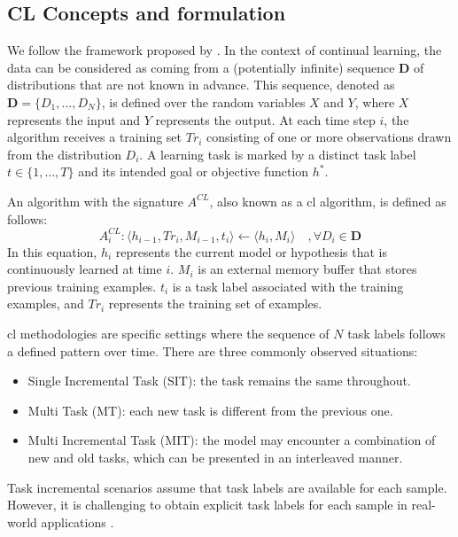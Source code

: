 \subsection{CL Concepts and formulation}
\label{subsec:cl_concepts}
We follow the framework proposed by \citep{lesort2020continual}. 
In the context of continual learning, the data can be considered as coming from a (potentially infinite) sequence $\mathbf{D}$ of distributions that are not known in advance. This sequence, denoted as $\mathbf{D} = \{ D_{1}, ..., D_{N} \}$, is defined over the random variables $X$ and $Y$, where $X$ represents the input and $Y$ represents the output. At each time step $i$, the algorithm receives a training set $Tr_{i}$ consisting of one or more observations drawn from the distribution $D_{i}$. A learning task is marked by a distinct task label $t\in \{ 1,\dots,T\}$ and its intended goal or objective function $h^{*}$.

An algorithm with the signature $A^{CL}$, also known as a \acrlong{cl} algorithm, is defined as follows: \begin{equation} \label{eq:CL_algo} A_{i}^{CL} : \langle h_{i-1}, Tr_{i}, M_{i-1}, t_{i} \rangle \leftarrow \langle h_{i}, M_{i} \rangle \quad , \forall D_{i} \in \mathbf{D} \end{equation} In this equation, $h_i$ represents the current model or hypothesis that is continuously learned at time $i$. $M_{i}$ is an external memory buffer that stores previous training examples. $t_{i}$ is a task label associated with the training examples, and $Tr_{i}$ represents the training set of examples.

\acrshort{cl} methodologies are specific settings where the sequence of $N$ task labels follows a defined pattern over time. There are three commonly observed situations: \begin{itemize} \item Single Incremental Task (SIT): the task remains the same throughout. \item Multi Task (MT): each new task is different from the previous one. \item Multi Incremental Task (MIT): the model may encounter a combination of new and old tasks, which can be presented in an interleaved manner. \end{itemize} Task incremental scenarios assume that task labels are available for each sample. However, it is challenging to obtain explicit task labels for each sample in real-world applications \citep{cossu2021continual}.

